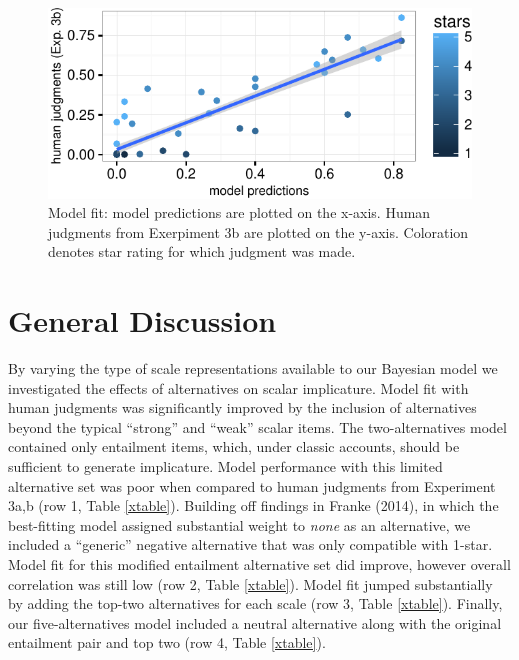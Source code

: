 \documentclass[10pt, letterpaper]{article}
\newenvironment{CodeChunk}{}{}
\begin{document}
\begin{CodeChunk}
\begin{figure}[t]

{\centering \includegraphics{figs/fiveAltsScatter-1} 

}

\caption[Model fit]{Model fit: model predictions are plotted on the x-axis. Human judgments from Exerpiment 3b are plotted on the y-axis. Coloration denotes star rating for which judgment was made.}\label{fig:fiveAltsScatter}
\end{figure}
\end{CodeChunk}

\section{General Discussion}\label{general-discussion}

By varying the type of scale representations available to our Bayesian
model we investigated the effects of alternatives on scalar implicature.
Model fit with human judgments was significantly improved by the
inclusion of alternatives beyond the typical ``strong'' and ``weak''
scalar items. The two-alternatives model contained only entailment
items, which, under classic accounts, should be sufficient to generate
implicature. Model performance with this limited alternative set was
poor when compared to human judgments from Experiment 3a,b (row 1, Table
\ref{xtable}). Building off findings in Franke (2014), in which the
best-fitting model assigned substantial weight to \emph{none} as an
alternative, we included a ``generic'' negative alternative that was
only compatible with 1-star. Model fit for this modified entailment
alternative set did improve, however overall correlation was still low
(row 2, Table \ref{xtable}). Model fit jumped substantially by adding
the top-two alternatives for each scale (row 3, Table \ref{xtable}).
Finally, our five-alternatives model included a neutral alternative
along with the original entailment pair and top two (row 4, Table
\ref{xtable}).
\end{document}
